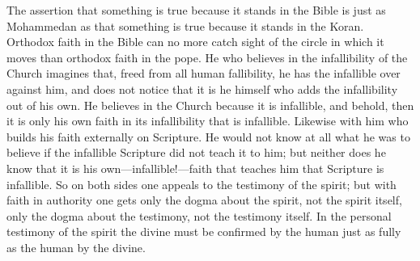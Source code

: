 \documentclass[12pt,a4paper,openany]{book}
\newcommand{\opage}[1]{\marginnote{\footnotesize\textit{[#1]}}}
\begin{document}
The assertion that something is true because it stands in the Bible is
just as Mohammedan as that something is true because it stands in the
Koran. Orthodox faith in the Bible can no more catch sight of the circle
in which it moves than orthodox faith in the pope. He who believes in the
infallibility of the Church imagines that, freed from all human
fallibility, he has the infallible over against him, and does not notice
that it is he himself who adds the infallibility out of his own. He
believes in the Church because it is infallible, and behold, then it is
only his own faith in its infallibility that is infallible. Likewise with
him who builds his faith externally on Scripture. He \opage{26}would not know at
all what he was to believe if the infallible Scripture did not teach it
to him; but neither does he know that it is his own---infallible!---faith
that teaches him that Scripture is infallible. So on both sides one
appeals to the testimony of the spirit; but with faith in authority one
gets only the dogma about the spirit, not the spirit itself, only the
dogma about the testimony, not the testimony itself. In the personal
testimony of the spirit the divine must be confirmed by the human just
as fully as the human by the divine.
\end{document}
